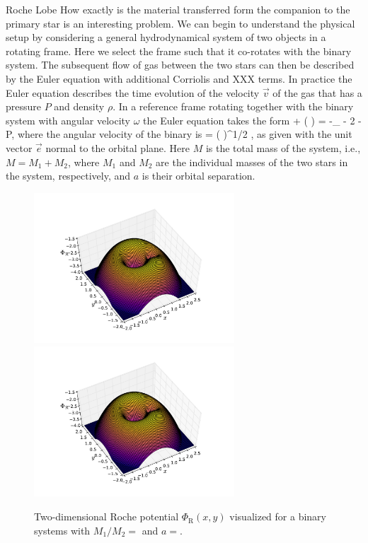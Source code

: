 Roche Lobe \cite{PRP02} \cite{LL15}
How exactly is the material transferred form the companion to the primary star is an interesting problem.
We can begin to understand the physical setup by considering a general hydrodynamical system of two objects in a rotating frame.
Here we select the frame such that it co-rotates with the binary system. %
The subsequent flow of gas between the two stars can then be described by the Euler equation with additional Corriolis and XXX terms.\cite[see, e.g,][for a good introduction]{Cho98}
In practice the Euler equation describes the time evolution of the velocity $\vec{v}$ of the gas that has a pressure $P$ and density $\rho$.
In a reference frame rotating together with the binary system with angular velocity $\omega$ the Euler equation takes the form 
\be
{} + ( \cdot \nabla) = -\nabla \Phi_{} - 2 \vec{ \omega } \times {} -  \nabla P,
\ee
where the angular velocity of the binary is
\be
\vec{ \omega } = \left(  \right)^{1/2} ,
\ee
as given with the unit vector $\vec{e}$ normal to the orbital plane.
Here $M$ is the total mass of the system, i.e., $M = M_1 + M_2$, where $M_1$ and $M_2$ are the individual masses of the two stars in the system, respectively, and $a$ is their orbital separation.

\begin{figure}[t]
\centering
\includegraphics[width=7.5cm]{figs/astro/roche.pdf}
\includegraphics[width=7.5cm]{figs/astro/roche.pdf}
\caption{\label{fig:roche}
    Two-dimensional Roche potential $\Phi_{\mathrm{R}}(x,y)$ visualized for a binary systems with $M_1/M_2 = $ and $a = $.
}
\end{figure}

